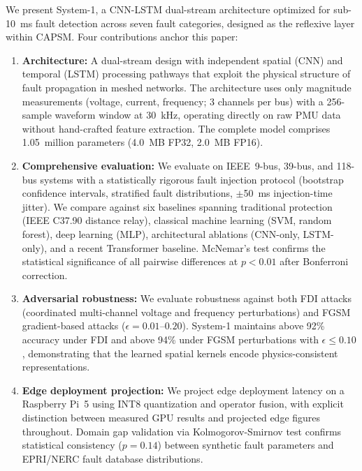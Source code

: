 \documentclass[journal]{IEEEtran}
\begin{document}
We present System-1, a CNN-LSTM dual-stream architecture optimized for sub-10~ms fault detection across seven fault categories, designed as the reflexive layer within CAPSM. Four contributions anchor this paper:

\begin{enumerate}
\item \textbf{Architecture:} A dual-stream design with independent spatial (CNN) and temporal (LSTM) processing pathways that exploit the physical structure of fault propagation in meshed networks. The architecture uses only magnitude measurements (voltage, current, frequency; 3 channels per bus) with a 256-sample waveform window at 30~kHz, operating directly on raw PMU data without hand-crafted feature extraction. The complete model comprises 1.05~million parameters (4.0~MB FP32, 2.0~MB FP16).

\item \textbf{Comprehensive evaluation:} We evaluate on IEEE~9-bus, 39-bus, and 118-bus systems with a statistically rigorous fault injection protocol (bootstrap confidence intervals, stratified fault distributions, $\pm$50~ms injection-time jitter). We compare against six baselines spanning traditional protection (IEEE C37.90 distance relay), classical machine learning (SVM, random forest), deep learning (MLP), architectural ablations (CNN-only, LSTM-only), and a recent Transformer baseline. McNemar's test confirms the statistical significance of all pairwise differences at $p < 0.01$ after Bonferroni correction.

\item \textbf{Adversarial robustness:} We evaluate robustness against both FDI attacks (coordinated multi-channel voltage and frequency perturbations) and FGSM gradient-based attacks ($\epsilon = 0.01$--$0.20$). System-1 maintains above 92\% accuracy under FDI and above 94\% under FGSM perturbations with $\epsilon \leq 0.10$, demonstrating that the learned spatial kernels encode physics-consistent representations.

\item \textbf{Edge deployment projection:} We project edge deployment latency on a Raspberry Pi~5 using INT8 quantization and operator fusion, with explicit distinction between measured GPU results and projected edge figures throughout. Domain gap validation via Kolmogorov-Smirnov test confirms statistical consistency ($p = 0.14$) between synthetic fault parameters and EPRI/NERC fault database distributions.
\end{enumerate}
\end{document}

